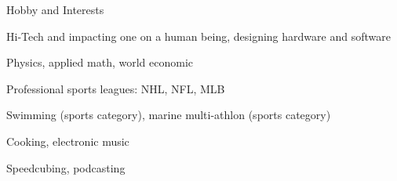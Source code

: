 \documentclass{template}
\begin{document}

\begin{rSection}{Hobby and Interests}
\begin{rHobby}

\item Hi-Tech and impacting one on a human being, designing hardware and software
\item Physics, applied math, world economic
\item Professional sports leagues: NHL, NFL, MLB
\item Swimming (sports category), marine multi-athlon (sports category)
\item Cooking, electronic music
\item Speedcubing, podcasting

\end{rHobby}
\end{rSection}
\end{document}
